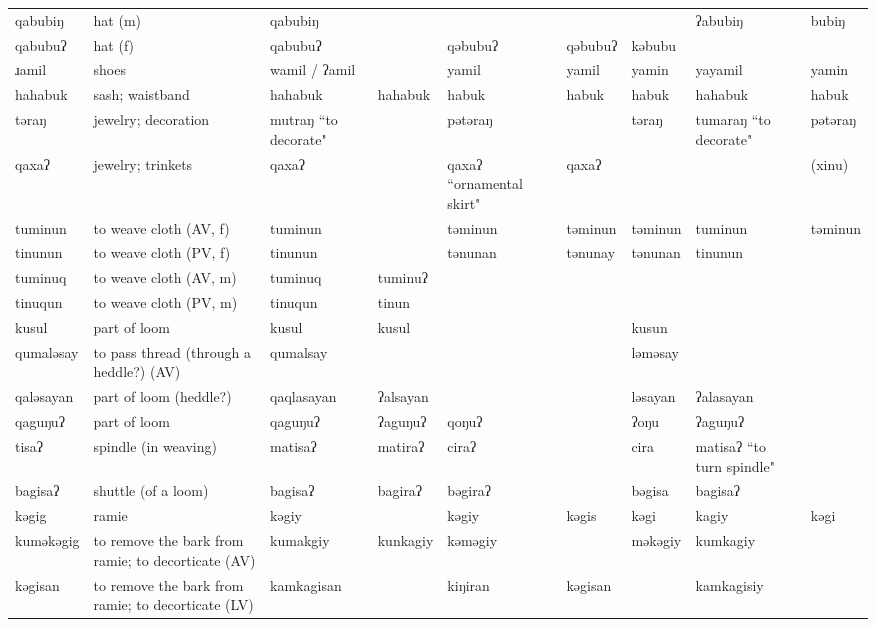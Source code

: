 \begin{landscape}
\begin{longtable}{*{9}{>{\raggedright\arraybackslash}p{}}}
\text{*}qabubiŋ & hat (m) & qabubiŋ &  &  &  &  & ʔabubiŋ & bubiŋ\\
\text{*}qabubuʔ & hat (f) & qabubuʔ &  & qəbubuʔ & qəbubuʔ & kəbubu &  & \\
\text{*}ɹamil & shoes & wamil / ʔamil &  & yamil & yamil & yamin & yayamil & yamin\\
\text{*}hahabuk & sash; waistband & hahabuk & hahabuk & habuk & habuk & habuk & hahabuk & habuk\\
\text{*}təraŋ & jewelry; decoration & mutraŋ \newline ``to decorate" &  & pətəraŋ &  & təraŋ & tumaraŋ \newline ``to decorate" & pətəraŋ\\
\text{*}qaxaʔ & jewelry; trinkets & qaxaʔ &  & qaxaʔ \newline ``ornamental skirt" & qaxaʔ &  &  & (xinu)\\
\text{*}tuminun & to weave cloth (AV, f) & tuminun &  & təminun & təminun & təminun & tuminun & təminun\\
\text{*}tinunun & to weave cloth (PV, f) & tinunun &  & tənunan & tənunay & tənunan & tinunun & \\
\text{*}tuminuq & to weave cloth (AV, m) & tuminuq & tuminuʔ &  &  &  &  & \\
\text{*}tinuqun & to weave cloth (PV, m) & tinuqun & tinun &  &  &  &  & \\
\text{*}kusul & part of loom & kusul & kusul &  &  & kusun &  & \\
\text{*}qumaləsay & to pass thread (through a heddle?) (AV) & qumalsay &  &  &  & ləməsay &  & \\
\text{*}qaləsayan & part of loom (heddle?) & qaqlasayan & ʔalsayan &  &  & ləsayan & ʔalasayan & \\
\text{*}qaguŋuʔ & part of loom & qaguŋuʔ & ʔaguŋuʔ & qoŋuʔ &  & ʔoŋu & ʔaguŋuʔ & \\
\text{*}tisaʔ & spindle (in weaving) & matisaʔ & matiraʔ & ciraʔ &  & cira & matisaʔ ``to turn spindle" & \\
\text{*}bagisaʔ & shuttle (of a loom) & bagisaʔ & bagiraʔ & bəgiraʔ &  & bəgisa & bagisaʔ & \\
\text{*}kəgig & ramie & kəgiy &  & kəgiy & kəgis & kəgi & kagiy & kəgi\\
\text{*}kuməkəgig & to remove the bark from ramie; to decorticate (AV) & kumakgiy & kunkagiy & kəməgiy &  & məkəgiy & kumkagiy & \\
\text{*}kəgisan & to remove the bark from ramie; to decorticate (LV) & kamkagisan &  & kiŋiran & kəgisan &  & kamkagisiy & \\

\end{longtable}
\end{landscape}
